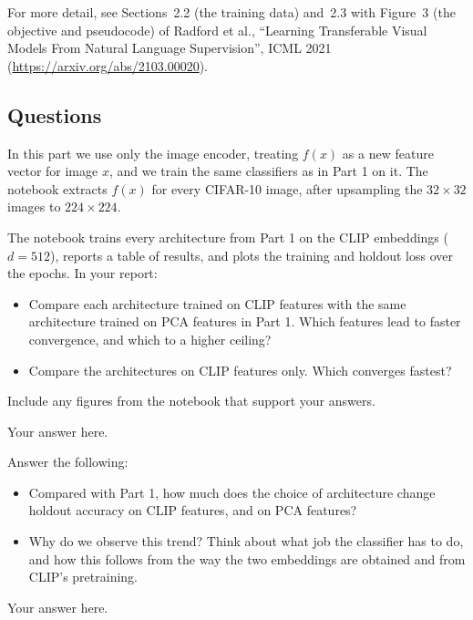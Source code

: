 For more detail, see Sections~2.2 (the training data) and~2.3 with Figure~3 (the
objective and pseudocode) of Radford et al., ``Learning Transferable Visual Models
From Natural Language Supervision'', ICML 2021 (\url{https://arxiv.org/abs/2103.00020}).

\subsection{Questions}

In this part we use only the image encoder, treating $f(x)$ as a new feature vector for
image $x$, and we train the same classifiers as in Part 1 on it. The notebook extracts $f(x)$
for every CIFAR-10 image, after upsampling the $32 \times 32$ images to
$224 \times 224$.

\begin{question}[10]
The notebook trains every architecture from Part 1 on the CLIP embeddings
($d = 512$), reports a table of results, and plots the training and holdout loss over
the epochs. In your report:
\begin{itemize}
  \item Compare each architecture trained on CLIP features with the same architecture
    trained on PCA features in Part 1. Which features lead to faster convergence, and
    which to a higher ceiling?
  \item Compare the architectures on CLIP features only. Which converges fastest?
\end{itemize}
Include any figures from the notebook that support your answers.
\end{question}

\begin{solution}
Your answer here.
\end{solution}

\begin{question}[10]
Answer the following:
\begin{itemize}
  \item Compared with Part 1, how much does the choice of architecture change holdout
    accuracy on CLIP features, and on PCA features?
  \item Why do we observe this trend? Think about what job the classifier has to do,
    and how this follows from the way the two embeddings are obtained and from CLIP's
    pretraining.
\end{itemize}
\end{question}

\begin{solution}
Your answer here.
\end{solution}

